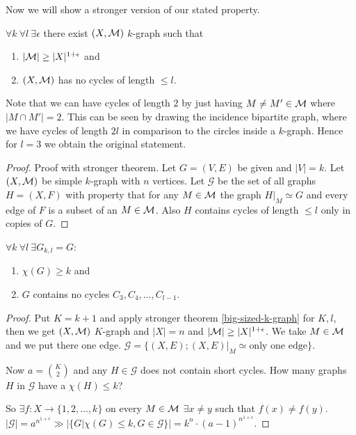 Now we will show a stronger version of our stated property.

\begin{thm}
	$\forall k \ \forall l \ \exists \epsilon$ there exist $(X, \mathcal{M})$ $k$-graph such that
	
	\begin{enumerate}
		\item $|\mathcal{M}| \geq |X|^{1 + \epsilon}$ and
		\item $(X, \mathcal{M})$ has no cycles of length $\leq l$.
	\end{enumerate}
	\label{big-sized-k-graph}
\end{thm}

Note that we can have cycles of length $2$ by just having $M \neq M' \in \mathcal{M}$ where $|M \cap M'| = 2$. This can be seen by drawing the incidence bipartite graph, where we have cycles of length $2l$ in comparison to the circles inside a $k$-graph. Hence for $l = 3$ we obtain the original statement.

\begin{proof}{Proof with stronger theorem.}
	Let $G = (V,E)$ be given and $|V| = k$. Let $(X, \mathcal{M})$ be simple $k$-graph with $n$ vertices. Let $\mathcal{G}$ be the set of all graphs $H = (X,F)$ with property that for any $M \in \mathcal{M}$ the graph $H|_M \simeq G$ and every edge of $F$ is a subset of an $M \in \mathcal{M}$. Also $H$ contains cycles of length $\leq l$ only in copies of $G$.
\end{proof}

\begin{thm}
	$\forall k \ \forall l \ \exists G_{k,l} = G$:
	
	\begin{enumerate}
		\item $\chi(G) \geq k$ and
		\item $G$ contains no cycles $C_3, C_4, \dots, C_{l-1}$.
	\end{enumerate}
\end{thm}

\begin{proof}
	Put $K = k+1$ and apply stronger theorem \ref{big-sized-k-graph} for $K,l$, then we get $(X, \mathcal{M})$ $K$-graph and $|X| = n$ and $|\mathcal{M}| \geq |X|^{1 + \epsilon}$. We take $M \in \mathcal{M}$ and we put there one edge. $\mathcal{G} = \{(X,E); (X,E)|_M \simeq \text{only one edge}\}$.
	
	Now $a = \binom{K}{2}$ and any $H \in \mathcal{G}$ does not contain short cycles. How many graphs $H$ in $\mathcal{G}$ have a $\chi(H) \leq k$?
	
	So $\exists f: X \to \{1, 2, \dots, k\}$ on every $M \in \mathcal{M}$ $\exists x \neq y$ such that $f(x) \neq f(y)$. $|\mathcal{G}| = a^{n^{1+\epsilon}} \gg |\{G | \chi(G) \leq k, G \in \mathcal{G}\}| = k^n \cdot (a-1)^{n^{1 + \epsilon}}$.
\end{proof}

